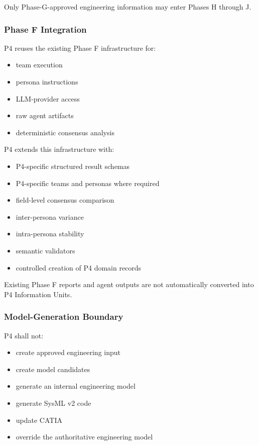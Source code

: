 Only Phase-G-approved engineering information may enter Phases H through J.

\hypertarget{phase-f-integration}{%
\subsubsection{Phase F Integration}\label{phase-f-integration}}

P4 reuses the existing Phase F infrastructure for:

\begin{itemize}
\tightlist
\item
  team execution
\item
  persona instructions
\item
  LLM-provider access
\item
  raw agent artifacts
\item
  deterministic consensus analysis
\end{itemize}

P4 extends this infrastructure with:

\begin{itemize}
\tightlist
\item
  P4-specific structured result schemas
\item
  P4-specific teams and personas where required
\item
  field-level consensus comparison
\item
  inter-persona variance
\item
  intra-persona stability
\item
  semantic validators
\item
  controlled creation of P4 domain records
\end{itemize}

Existing Phase F reports and agent outputs are not automatically converted into P4 Information Units.

\hypertarget{model-generation-boundary}{%
\subsubsection{Model-Generation Boundary}\label{model-generation-boundary}}

P4 shall not:

\begin{itemize}
\tightlist
\item
  create approved engineering input
\item
  create model candidates
\item
  generate an internal engineering model
\item
  generate SysML v2 code
\item
  update CATIA
\item
  override the authoritative engineering model
\end{itemize}

